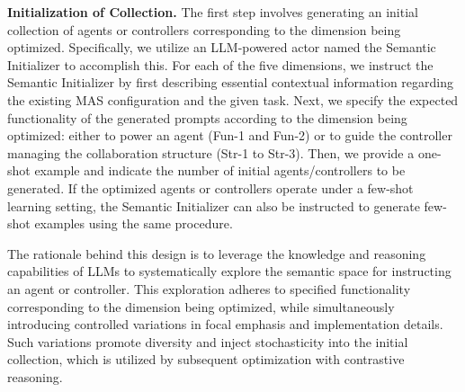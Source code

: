 


\noindent \textbf{Initialization of Collection.} The first step involves generating an initial collection of agents or controllers corresponding to the dimension being optimized. Specifically, we utilize an LLM-powered actor named the Semantic Initializer to accomplish this. For each of the five dimensions, we instruct the Semantic Initializer by first describing essential contextual information regarding the existing MAS configuration and the given task. Next, we specify the expected functionality of the generated prompts according to the dimension being optimized: either to power an agent (Fun-1 and Fun-2) or to guide the controller managing the collaboration structure (Str-1 to Str-3).
Then, we provide a one-shot example and indicate the number of initial agents/controllers to be generated. If the optimized agents or controllers operate under a few-shot learning setting, the Semantic Initializer can also be instructed to generate few-shot examples using the same procedure.



The rationale behind this design is to leverage the knowledge and reasoning capabilities of LLMs to systematically explore the semantic space for instructing an agent or controller. This exploration adheres to specified functionality corresponding to the dimension being optimized, while simultaneously introducing controlled variations in focal emphasis and implementation details. Such variations promote diversity and inject stochasticity into the initial collection, which is utilized by subsequent optimization with contrastive reasoning.


